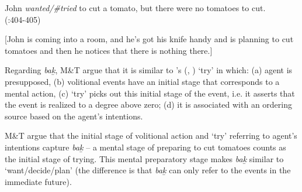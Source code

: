 \documentclass[output=paper]{langscibook}
\begin{document}
\begin{exe}\judgewidth{\#}
\ex \label{Todoro41}
John \textit{wanted/\#tried} to cut a tomato, but there were no tomatoes to cut.
	\\(\citealt{sharvit2003a}:404-405)

\ex \label{Todoro42} 
[John is coming into a room, and he’s got his knife handy and is 	planning to cut tomatoes and then he notices that there is nothing there.]
\begin{xlist}

 


\end{xlist}
\end{exe}

Regarding \emph{bak̲}, M\&T argue that it is similar to \citeauthor{grano2011a}’s (\citeyear{grano2011a}, \citeyear{grano2017a}) ‘try’ in which: (a) agent is presupposed, (b) volitional events have an initial stage that corresponds to a mental action, (c) ‘try’ picks out this initial stage of the event, i.e. it asserts that the event is realized to a degree above zero; (d) it is associated with an ordering source based on the agent’s intentions. 

M\&T argue that the initial stage of volitional action and ‘try’ referring to agent’s intentions capture \emph{bak̲} -- a mental stage of preparing to cut tomatoes counts as the initial stage of trying. This mental preparatory stage makes \emph{bak̲} similar to ‘want/decide/plan’ (the difference is that \emph{bak̲} can only refer to the events in the immediate future). 
\end{document}
